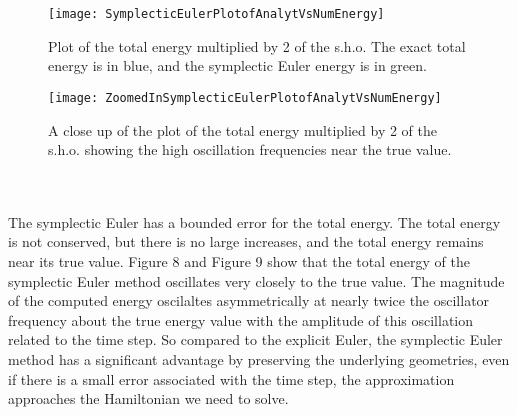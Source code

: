 \documentclass[12pt]{article}
\begin{document}
\begin{figure}[h!]
\begin{minipage}[b]{0.45\linewidth}
\centering
\texttt{[image: SymplecticEulerPlotofAnalytVsNumEnergy]}
\caption{Plot of the total energy multiplied by 2 of the s.h.o. The exact total energy is in blue, and the symplectic Euler energy is in green.}
\label{fig:figure8}
\end{minipage}
\hspace{0.5cm}
\begin{minipage}[b]{0.45\linewidth}
\centering
\texttt{[image: ZoomedInSymplecticEulerPlotofAnalytVsNumEnergy]}
\caption{A close up of the plot of the total energy multiplied by 2 of the s.h.o. showing the high oscillation frequencies near the true value.}
\label{fig:figure9}
\end{minipage}
\end{figure}
\\\\\indent The symplectic Euler has a bounded error for the total energy. The total energy is not conserved, but there is no large increases, and the total energy remains near its true value. Figure 8 and Figure 9 show that the total energy of the symplectic Euler method oscillates very closely to the true value. The magnitude of the computed energy oscilaltes asymmetrically at nearly twice the oscillator frequency about the true energy value with the amplitude of this oscillation related to the time step. So compared to the explicit Euler, the symplectic Euler method has a significant advantage by preserving the underlying geometries, even if there is a small error associated with the time step, the approximation approaches the Hamiltonian we need to solve. 
\end{document}
